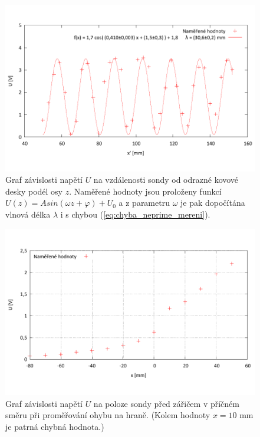 \documentclass[english]{article}
\begin{document}
	\begin{figure}[h!]
	\begin{center}
	    \vspace*{-1cm}
		\includegraphics[width=\linewidth]{../gnuplot/3_stoj.pdf}
	    \vspace*{-2cm}
		\caption{Graf závislosti napětí $U$ na vzdálenosti sondy od odrazné kovové desky podél osy $z$. Naměřené hodnoty jsou proloženy funkcí $U(z) = A sin(\omega z+\varphi)+U_0$ a z parametru $\omega$ je pak dopočítána vlnová délka $\lambda$ i s chybou (\ref{eq:chyba_neprime_mereni}).  }
		\label{fig:g_stoj}
	\end{center}
	\end{figure}				
	
	\begin{figure}[h!]
	\begin{center}
	    \vspace*{-1cm}
		\includegraphics[width=\linewidth]{../gnuplot/4_ohyb.pdf}
	    \vspace*{-2cm}
		\caption{Graf závislosti napětí $U$ na poloze sondy před zářičem v příčném směru při proměřování ohybu na hraně. (Kolem hodnoty $x=10$ mm je patrná chybná hodnota.) }
		\label{fig:g_ohyb}
	\end{center}
	\end{figure}			
	
\end{document}
